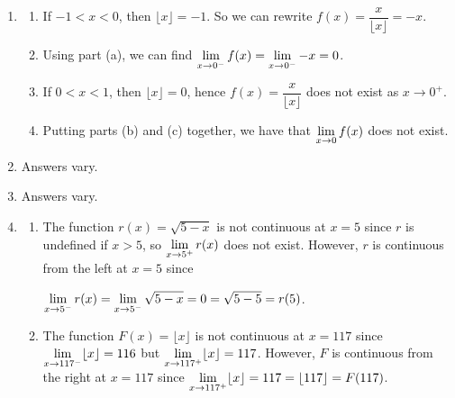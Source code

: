 \begin{enumerate}
\setcounter{enumi}{\value{HW}}

\item   \begin{enumerate}

\item  If $-1 < x < 0$, then $\lfloor x \rfloor = -1$. So we can rewrite $f(x) = \dfrac{x}{\lfloor x \rfloor} = -x$.

\smallskip

\item  Using part (a), we can find  $\displaystyle{ \lim_{x \rightarrow 0^{-}} f(x) =  \lim_{x \rightarrow 0^{-}} -x = 0}$.

\smallskip

\item  If $0 < x < 1$, then $\lfloor x \rfloor =0$, hence $f(x) = \dfrac{x}{\lfloor x \rfloor}$ does not exist as $x \rightarrow 0^{+}$.

\smallskip

\item  Putting parts (b) and (c) together, we have that   $\displaystyle{ \lim_{x \rightarrow 0} f(x)}$   does not exist.

\smallskip

\end{enumerate}

\item Answers vary.

\item  Answers vary.

\item \begin{enumerate} \item    The function $r(x) = \sqrt{5-x}$ is not continuous at $x = 5$ since $r$ is undefined if $x>5$, so $\displaystyle{\lim_{x \rightarrow 5^{+}} r(x)}$ does not exist. However, $r$ is continuous from the left at $x = 5$ since 

$\displaystyle{\lim_{x \rightarrow 5^{-}} r(x) =  \lim_{x \rightarrow 5^{-}} \sqrt{5-x} = 0 = \sqrt{5-5} = r(5)}$.

\smallskip

\item  The function  $F(x) = \lfloor x \rfloor$ is not continuous at $x = 117$ since $\displaystyle{\lim_{x \rightarrow 117^{-}} \lfloor x \rfloor = 116}$ but $\displaystyle{\lim_{x \rightarrow 117^{+}} \lfloor x \rfloor = 117}$.  However, $F$ is continuous from the right at $x = 117$ since $\displaystyle{\lim_{x \rightarrow 117^{+}} \lfloor x \rfloor = 117 = \lfloor 117 \rfloor = F(117)}$. 


\end{enumerate}
\end{enumerate}
